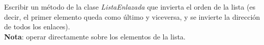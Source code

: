 \begin{ejercicio}
Escribir un método de la clase {\it ListaEnlazada} que invierta el orden
de la lista (es decir, el primer elemento queda como último y
viceversa, y se invierte la dirección de todos los enlaces). \\
{\bf Nota}: operar directamente sobre los elementos de la lista.
\end{ejercicio}

